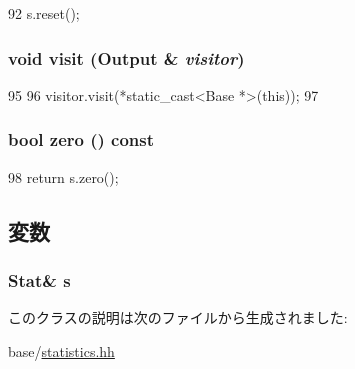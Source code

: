 \begin{DoxyCode}
92 { s.reset(); }
\end{DoxyCode}
\hypertarget{classStats_1_1InfoProxy_adb3e1761782ea843b4400aeeaa6c4887}{
\subsubsection[{visit}]{\setlength{\rightskip}{0pt plus 5cm}void visit ({\bf Output} \& {\em visitor})}}
\label{classStats_1_1InfoProxy_adb3e1761782ea843b4400aeeaa6c4887}



\begin{DoxyCode}
95     {
96         visitor.visit(*static_cast<Base *>(this));
97     }
\end{DoxyCode}
\hypertarget{classStats_1_1InfoProxy_a4e72b01b727d3165e75cba84eb507491}{
\subsubsection[{zero}]{\setlength{\rightskip}{0pt plus 5cm}bool zero () const}}
\label{classStats_1_1InfoProxy_a4e72b01b727d3165e75cba84eb507491}



\begin{DoxyCode}
98 { return s.zero(); }
\end{DoxyCode}


\subsection{変数}
\hypertarget{classStats_1_1InfoProxy_a760b7b0da63b189c3cb0f268b2af0d2c}{
\subsubsection[{s}]{\setlength{\rightskip}{0pt plus 5cm}Stat\& {\bf s}}}
\label{classStats_1_1InfoProxy_a760b7b0da63b189c3cb0f268b2af0d2c}


このクラスの説明は次のファイルから生成されました:\begin{DoxyCompactItemize}
\item 
base/\hyperlink{statistics_8hh}{statistics.hh}\end{DoxyCompactItemize}
